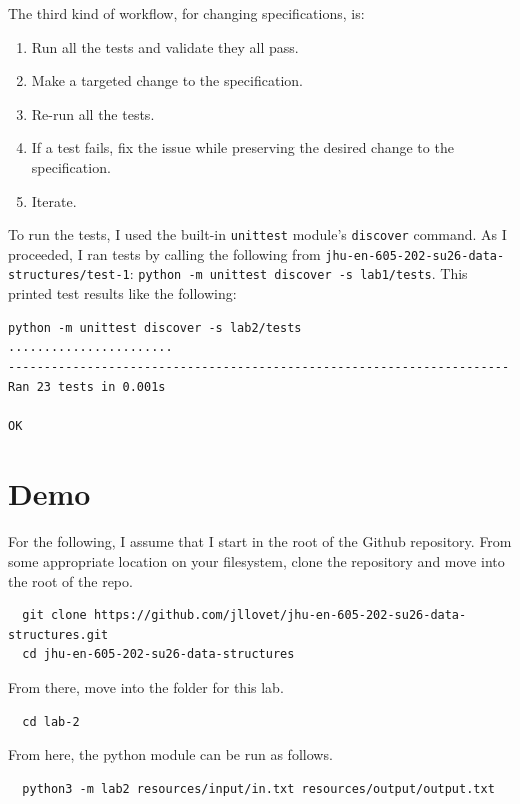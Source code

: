 \documentclass[10pt,letterpaper,final]{report}
\begin{document}
\noindent The third kind of workflow, for changing specifications, is:

\begin{enumerate}
  \item Run all the tests and validate they all pass.
  \item Make a targeted change to the specification.
  \item Re-run all the tests.
  \item If a test fails, fix the issue while preserving the desired change to the specification.
  \item Iterate.
\end{enumerate}

To run the tests, I used the built-in \texttt{unittest} module's \texttt{discover} command. As I proceeded, I ran tests by calling the following from \texttt{jhu-en-605-202-su26-data-structures/test-1}: \texttt{python -m unittest discover -s lab1/tests}. This printed test results like the following:

{\small
  \begin{verbatim}
python -m unittest discover -s lab2/tests                                     
.......................
----------------------------------------------------------------------
Ran 23 tests in 0.001s

OK
\end{verbatim}
}

\pagebreak
\section{Demo}\label{sec:demo}

For the following, I assume that I start in the root of the Github repository. From some appropriate location on your filesystem, clone the repository and move into the root of the repo.
  {\small
    \begin{verbatim}
  git clone https://github.com/jllovet/jhu-en-605-202-su26-data-structures.git
  cd jhu-en-605-202-su26-data-structures
\end{verbatim}
  }

\noindent From there, move into the folder for this lab.

  {\small
    \begin{verbatim}
  cd lab-2
\end{verbatim}
  }

\noindent From here, the python module can be run as follows.

  {\small
    \begin{verbatim}
  python3 -m lab2 resources/input/in.txt resources/output/output.txt
\end{verbatim}
  }
\end{document}
